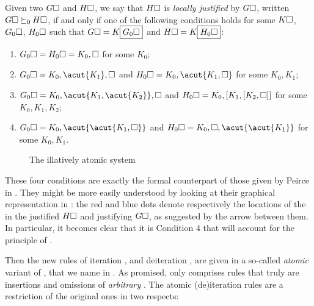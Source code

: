 \begin{scope}
\begin{scope}
\begin{definition}

  Given two  $G\square$ and $H\square$, we say that $H\square$ is
  \emph{locally justified} by $G\square$, written $G\square \mathbin{\succeq_0} H\square$, if and
  only if one of the following conditions holds for some $K\square$, $G_0\square$,
  $H_0\square$ such that $G\square = K\fbox{$G_0\square$}$ and $H\square =
  K\fbox{$H_0\square$}$:
  \begin{enumerate}
    \item $G_0\square = H_0\square = K_0, \square$ for some $K_0$;
    \item $G_0\hole = K_0, \acut{K_1}, \hole$ and $H_0\hole = K_0, \acut{K_1, \hole}$ for
    some $K_0, K_1$;
    \item $G_0\hole = K_0, \acut{K_1, \acut{K_2}}, \hole$ and $H_0\square = K_0, [K_1, [K_2,
    \square]]$ for some $K_0, K_1, K_2$;
    \item $G_0\hole = K_0, \acut{\acut{K_1, \hole}}$ and $H_0\hole = K_0, \hole, \acut{\acut{K_1}}$
    for some $K_0, K_1$.
  \end{enumerate}
\end{definition}

\begin{figure}
  
  \caption{The illatively atomic system }
\end{figure}

\AP
These four conditions are exactly the formal counterpart of those given by
Peirce in \cite{peirce_prolegomena_1906}. They might be more easily understood
by looking at their graphical representation in :
the red and blue dots denote respectively the locations of the  in the
justified  $H\square$ and justifying  $G\square$, as
suggested by the arrow between them. In particular, it becomes clear that it is
Condition 4 that will account for the principle of .

Then the new rules of iteration ,  and deiteration
,  are given in a so-called \emph{atomic} variant of
, that we name  in . As
promised,  only comprises rules that truly are insertions and
omissions of \emph{arbitrary} . The atomic (de)iteration rules are a restriction of
the original ones in two respects:


\end{scope}
\end{scope}
